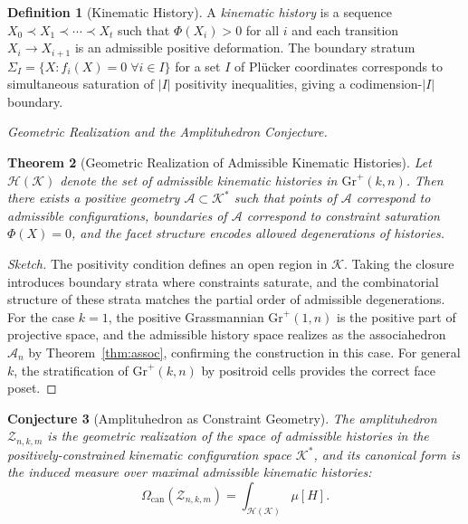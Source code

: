 \documentclass[12pt, oneside]{amsart}
\theoremstyle{plain}
\newtheorem{theorem}{Theorem}[section]
\newtheorem{conjecture}[theorem]{Conjecture}
\theoremstyle{definition}
\newtheorem{definition}[theorem]{Definition}
\theoremstyle{remark}
\newcommand{\Phif}{\Phi}
\newcommand{\Assoc}{\mathcal{A}_n}
\newcommand{\CF}{\Omega_{\mathrm{can}}}
\begin{document}
\begin{definition}[Kinematic History]
A \emph{kinematic history} is a sequence $X_0 \prec X_1 \prec \cdots \prec X_t$ such that $\Phif(X_i) > 0$ for all $i$ and each transition $X_i \to X_{i+1}$ is an admissible positive deformation. The boundary stratum $\Sigma_I = \{X : f_i(X) = 0 \; \forall i \in I\}$ for a set $I$ of Pl\"ucker coordinates corresponds to simultaneous saturation of $|I|$ positivity inequalities, giving a codimension-$|I|$ boundary.
\end{definition}

\medskip\noindent\textit{Geometric Realization and the Amplituhedron Conjecture.}

\begin{theorem}[Geometric Realization of Admissible Kinematic Histories]
\label{thm:amplituhedron-realization}
Let $\mathcal{H}(\mathcal{K})$ denote the set of admissible kinematic histories in $\mathrm{Gr}^+(k,n)$. Then there exists a positive geometry $\mathcal{A} \subset \mathcal{K}^*$ such that points of $\mathcal{A}$ correspond to admissible configurations, boundaries of $\mathcal{A}$ correspond to constraint saturation $\Phif(X) = 0$, and the facet structure encodes allowed degenerations of histories.
\end{theorem}

\begin{proof}[Sketch]
The positivity condition defines an open region in $\mathcal{K}$. Taking the closure introduces boundary strata where constraints saturate, and the combinatorial structure of these strata matches the partial order of admissible degenerations. For the case $k=1$, the positive Grassmannian $\mathrm{Gr}^+(1,n)$ is the positive part of projective space, and the admissible history space realizes as the associahedron $\Assoc$ by Theorem~\ref{thm:assoc}, confirming the construction in this case. For general $k$, the stratification of $\mathrm{Gr}^+(k,n)$ by positroid cells provides the correct face poset.
\end{proof}

\begin{conjecture}[Amplituhedron as Constraint Geometry]
\label{conj:amplituhedron}
The amplituhedron $\mathcal{Z}_{n,k,m}$ is the geometric realization of the space of admissible histories in the positively-constrained kinematic configuration space $\mathcal{K}^*$, and its canonical form is the induced measure over maximal admissible kinematic histories:
\[
  \CF(\mathcal{Z}_{n,k,m}) = \int_{\mathcal{H}(\mathcal{K})} \mu[H].
\]
\end{conjecture}
\end{document}
